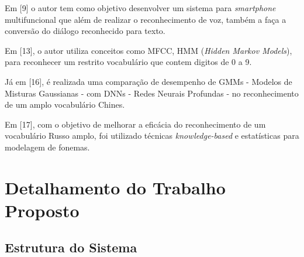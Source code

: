 \documentclass[a4paper,12pt,twoside,openright]{report}
\begin{document}
\par Em [9] o autor tem como objetivo desenvolver um sistema para \textit{smartphone} multifuncional que al\'{e}m de realizar o reconhecimento de voz, tamb\'{e}m a fa{\c c}a a convers\~{a}o do di\'{a}logo reconhecido para texto.

\par Em [13], o autor utiliza conceitos como MFCC, HMM (\textit{Hidden Markov Models}), para reconhecer um restrito vocabul\'{a}rio que contem digitos de 0 a 9.

\par J\'{a} em [16], \'{e} realizada uma compara{\c c}\~{a}o de desempenho de GMMs - Modelos de Misturas Gaussianas - com DNNs - Redes Neurais Profundas - no reconhecimento de um amplo vocabul\'{a}rio Chines. 

\par Em [17], com o objetivo de melhorar a efic\'{a}cia do reconhecimento de um vocabul\'{a}rio Russo amplo, foi utilizado t\'{e}cnicas \textit{knowledge-based} e estat\'{i}sticas para modelagem de fonemas.



\chapter{Detalhamento do Trabalho Proposto}
\label{cap3}
\thispagestyle{myheadings}
\vspace*{-0.3cm}
\section{Estrutura do Sistema}
\label{estrutura_sistema}

\end{document}
